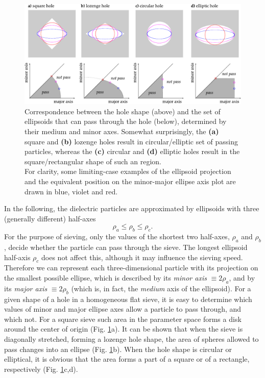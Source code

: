 \begin{figure}[ht] \caption{Correspondence between the hole shape (above) and the set of ellipsoids that can pass through the hole (below), determined by their medium and minor axes. Somewhat surprisingly, the \textbf{(a)} square and \textbf{(b)} lozenge holes result in circular/elliptic set of passing particles, whereas the \textbf{(c)} circular and \textbf{(d)} elliptic holes result in the square/rectangular shape of such an region.\\
For clarity, some limiting-case examples of the ellipsoid projection and the equivalent position on the minor-major ellipse axis plot are drawn in blue, violet and red. } \label{fg_sieve_pass_notpass} \centering 
\includegraphics[width=\textwidth]{img/technology/sieve_pass_notpass.pdf}
\end{figure}
In the following, the dielectric particles are approximated by ellipsoids with three (generally different) half-axes $$\rho_a \leq \rho_b \leq \rho_c.$$ For the purpose of sieving, only the values of the shortest two half-axes, $\rho_a$ and $\rho_b$, decide whether the particle can pass through the sieve. The longest ellipsoid half-axis $\rho_c$ does not affect this, although it may influence the sieving speed. Therefore we can represent each three-dimensional particle with its projection on the smallest possible ellipse, which is described by its \textit{minor axis} $\equiv 2\rho_a$, and by its \textit{major axis} $\equiv 2\rho_b$ (which is, in fact, the \textit{medium} axis of the ellipsoid). For a given shape of a hole in a homogeneous flat sieve, it is easy to determine which values of minor and major ellipse axes allow a particle to pass through, and which not. For a square sieve such area in the parameter space forms a disk around the center of origin (Fig. \ref{fg_sieve_pass_notpass}a). It can be shown that when the sieve is diagonally stretched, forming a lozenge hole shape, the area of spheres allowed to pass changes into an ellipse (Fig. \ref{fg_sieve_pass_notpass}b). When the hole shape is circular or elliptical, it is obvious that the area forms a part of a square or of a rectangle, respectively  (Fig. \ref{fg_sieve_pass_notpass}c,d).

